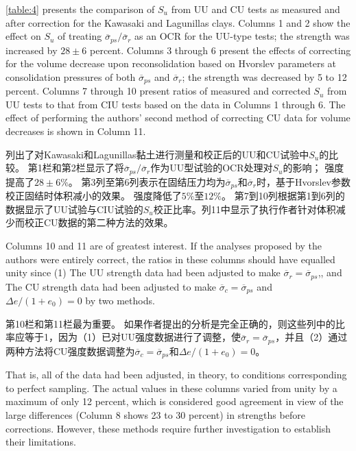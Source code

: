 \begin{paracol}{2}

    \autoref{table:4} presents the comparison of $S_u$ from UU and CU tests as measured and after correction for the Kawasaki and Lagunillas clays. Columns 1 and 2 show the effect on $S_u$ of treating $\overline{\sigma}_{ps}/\overline{\sigma}_r$ as an OCR for the UU-type tests; the strength was increased by $28\pm{6}$ percent. Columns 3 through 6 present the effects of correcting for the volume decrease upon reconsolidation based on Hvorslev parameters at consolidation pressures of both $\overline{\sigma}_{ps}$ and $\overline{\sigma}_r$; the strength was decreased by 5 to 12 percent. Columns 7 through 10 present ratios of measured and corrected $S_u$ from UU tests to that from CIU tests based on the data in Columns 1 through 6. The effect of performing the authors' second method of correcting CU data for volume decreases is shown in Column 11.

    \switchcolumn

    列出了对Kawasaki和Lagunillas黏土进行测量和校正后的UU和CU试验中$S_u$的比较。 第1栏和第2栏显示了将$\overline{\sigma}_{ps}/\overline{\sigma}_r$作为UU型试验的OCR处理对$S_u$的影响； 强度提高了$28\pm{6}\%$。 第3列至第6列表示在固结压力均为$\overline{\sigma}_{ps}$和$\overline{\sigma}_r$时，基于Hvorslev参数校正固结时体积减小的效果。 强度降低了$5\%$至$12\%$。 第7到10列根据第1到6列的数据显示了UU试验与CIU试验的$S_u$校正比率。列11中显示了执行作者针对体积减少而校正CU数据的第二种方法的效果。

    \switchcolumn*

    Columns 10 and 11 are of greatest interest. If the analyses proposed by the authors were entirely correct, the ratios in these columns should have equalled unity since (1) The UU strength data had been adjusted to make $\overline{\sigma}_r=\overline{\sigma}_{ps}$,, and The CU strength data had been adjusted to make $\overline{\sigma}_c=\overline{\sigma}_{ps}$ and $\Delta{e}/(1+e_0)=0$ by two methods.

    \switchcolumn

    第10栏和第11栏最为重要。 如果作者提出的分析是完全正确的，则这些列中的比率应等于1，因为（1）已对UU强度数据进行了调整，使$\overline{\sigma}_r=\overline{\sigma}_{ps}$，并且（2）通过两种方法将CU强度数据调整为$\overline{\sigma}_c=\overline{\sigma}_{ps}$和$\Delta{e}/(1+e_0)=0$。
    
    \switchcolumn*
    
    That is, all of the data had been adjusted, in theory, to conditions corresponding to perfect sampling. The actual values in these columns varied from unity by a maximum of only 12 percent, which is considered good agreement in view of the large differences (Column 8 shows 23 to 30 percent) in strengths before corrections. However, these methods require further investigation to establish their limitations.


\end{paracol}
